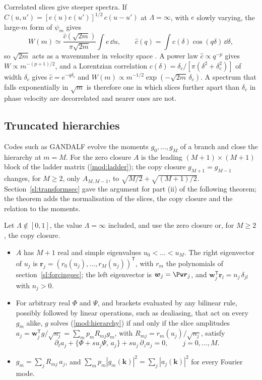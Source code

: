 Correlated slices give steeper spectra. If $C(u,u')=[e(u)e(u')]^{1/2}\,c(u-u')$ at $\Lambda=\infty$, with $e$ slowly varying, the large-$m$ form of $\psi_m$ gives
\begin{equation}\label{eq:corrspec}
  W(m)\simeq\frac{\hat c(\sqrt{2m})}{\pi\sqrt{2m}}\int e\,\dd u,\qquad \hat c(q)=\int c(\delta)\cos(q\delta)\,\dd\delta ,
\end{equation}
so $\sqrt{2m}$ acts as a wavenumber in velocity space \citep{Schekochihin2016,AdkinsSchekochihin2018}. A power law $\hat c\propto q^{-p}$ gives $W\propto m^{-(p+1)/2}$, and a Lorentzian correlation $c(\delta)=\delta_c/[\pi(\delta^2+\delta_c^2)]$ of width $\delta_c$ gives $\hat c=e^{-q\delta_c}$ and $W(m)\propto m^{-1/2}\exp(-\sqrt{2m}\,\delta_c)$. A spectrum that falls exponentially in $\sqrt m$ is therefore one in which slices further apart than $\delta_c$ in phase velocity are decorrelated and nearer ones are not.

\subsection{Truncated hierarchies}\label{hm:trunc}

Codes such as GANDALF evolve the moments $g_0,\dots,g_M$ of a branch and close the hierarchy at $m=M$. For the zero closure $A$ is the leading $(M+1)\times(M+1)$ block of the ladder matrix (\ref{mod:ladder}); the copy closure $g_{M+1}=g_{M-1}$ changes, for $M\ge2$, only $A_{M,M-1}$, to $\sqrt{M/2}+\sqrt{(M+1)/2}$. Section~\ref{sl:transformsec} gave the argument for part (ii) of the following theorem; the theorem adds the normalisation of the slices, the copy closure and the relation to the moments.

\begin{theorem}\label{thm:trunc}
Let $\Lambda\notin[0,1]$, the value $\Lambda=\infty$ included, and use the zero closure or, for $M\ge2$, the copy closure.
\begin{itemize}
\item[(i)] $A$ has $M+1$ real and simple eigenvalues $u_0<\dots<u_M$. The right eigenvector of $u_j$ is $\boldsymbol r_j=(r_0(u_j),\dots,r_M(u_j))^{\mathsf T}$, with $r_m$ the polynomials of section~\ref{sl:forcingsec}; the left eigenvector is $\boldsymbol w_j=\Pw\boldsymbol r_j$, and $\boldsymbol w_j^{\mathsf T}\boldsymbol r_l=n_j\,\delta_{jl}$ with $n_j>0$.
\item[(ii)] For arbitrary real $\Phi$ and $\Psi$, and brackets evaluated by any bilinear rule, possibly followed by linear operations, such as dealiasing, that act on every $g_m$ alike, $g$ solves (\ref{mod:hierarchy}) if and only if the slice amplitudes $a_j=\boldsymbol w_j^{\mathsf T}g/\sqrt{n_j}=\sum_mp_mR_{mj}g_m$, with $R_{mj}=r_m(u_j)/\sqrt{n_j}$, satisfy
\begin{equation}\label{eq:truncslice}
  \partial_ta_j+\{\Phi+su_j\Psi,\,a_j\}+su_j\,\partial_za_j=0,\qquad j=0,\dots,M .
\end{equation}
\item[(iii)] $g_m=\sum_jR_{mj}\,a_j$, and $\sum_mp_m|g_m(\boldsymbol k)|^2=\sum_j|a_j(\boldsymbol k)|^2$ for every Fourier mode.
\end{itemize}
\end{theorem}

